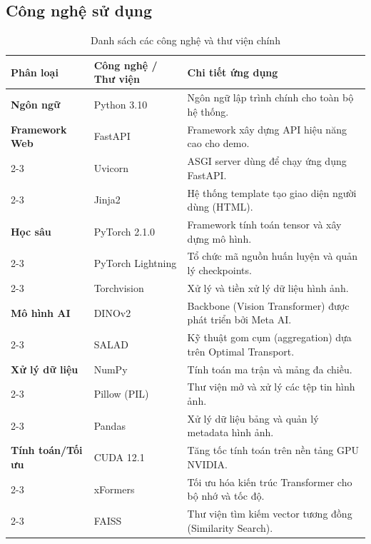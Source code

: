 \documentclass[12pt,a4paper]{article}
\begin{document}
\subsection{Công nghệ sử dụng}
\begin{table}[H] %
\centering
\caption{Danh sách các công nghệ và thư viện chính}
\label{tab:technologies}
\renewcommand{\arraystretch}{1.5} 
\begin{tabular}{|l|l|p{6cm}|}
\hline
\textbf{Phân loại} & \textbf{Công nghệ / Thư viện} & \textbf{Chi tiết ứng dụng} \\ \hline
\textbf{Ngôn ngữ} & Python 3.10 & Ngôn ngữ lập trình chính cho toàn bộ hệ thống. \\ \hline
\textbf{Framework Web} & FastAPI & Framework xây dựng API hiệu năng cao cho demo. \\ \cline{2-3}
 & Uvicorn & ASGI server dùng để chạy ứng dụng FastAPI. \\ \cline{2-3}
 & Jinja2 & Hệ thống template tạo giao diện người dùng (HTML). \\ \hline
\textbf{Học sâu} & PyTorch 2.1.0 & Framework tính toán tensor và xây dựng mô hình. \\ \cline{2-3}
 & PyTorch Lightning & Tổ chức mã nguồn huấn luyện và quản lý checkpoints. \\ \cline{2-3}
 & Torchvision & Xử lý và tiền xử lý dữ liệu hình ảnh. \\ \hline
\textbf{Mô hình AI} & DINOv2 & Backbone (Vision Transformer) được phát triển bởi Meta AI. \\ \cline{2-3}
 & SALAD & Kỹ thuật gom cụm (aggregation) dựa trên Optimal Transport. \\ \hline
\textbf{Xử lý dữ liệu} & NumPy & Tính toán ma trận và mảng đa chiều. \\ \cline{2-3}
 & Pillow (PIL) & Thư viện mở và xử lý các tệp tin hình ảnh. \\ \cline{2-3}
 & Pandas & Xử lý dữ liệu bảng và quản lý metadata hình ảnh. \\ \hline
\textbf{Tính toán/Tối ưu} & CUDA 12.1 & Tăng tốc tính toán trên nền tảng GPU NVIDIA. \\ \cline{2-3}
 & xFormers & Tối ưu hóa kiến trúc Transformer cho bộ nhớ và tốc độ. \\ \cline{2-3}
 & FAISS & Thư viện tìm kiếm vector tương đồng (Similarity Search). \\ \hline
\end{tabular}
\end{table}
\end{document}
